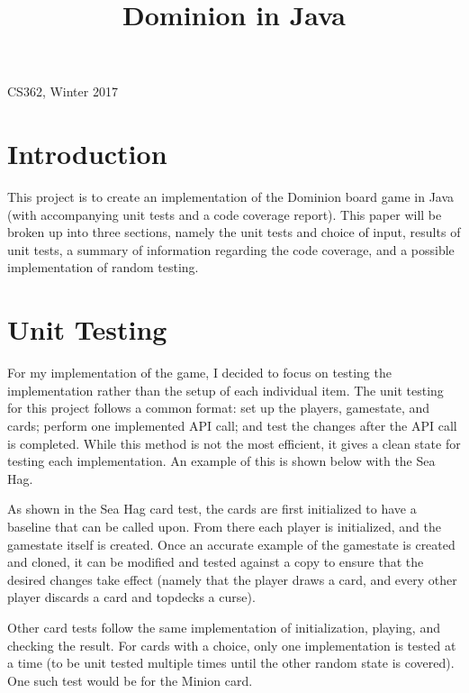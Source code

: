 \documentclass[letterpaper,10pt,onecolumn,draftclsnofoot]{IEEEtran}
\title{Dominion in Java}
\author{\name}
\def\class{CS362, Winter 2017}
\begin{document}
\clearpage
\maketitle
\thispagestyle{empty} %
\vspace{-10ex}
{\centering \class \par}

\section{Introduction}
This project is to create an implementation of the Dominion board game in Java (with accompanying unit tests and a code coverage report). This paper will be broken up into three sections, namely the unit tests and choice of input, results of unit tests, a summary of information regarding the code coverage, and a possible implementation of random testing.

\section{Unit Testing}
For my implementation of the game, I decided to focus on testing the implementation rather than the setup of each individual item. The unit testing for this project follows a common format: set up the players, gamestate, and cards; perform one implemented API call; and test the changes after the API call is completed. While this method is not the most efficient, it gives a clean state for testing each implementation. An example of this is shown below with the Sea Hag.



As shown in the Sea Hag card test, the cards are first initialized to have a baseline that can be called upon. From there each player is initialized, and the gamestate itself is created. Once an accurate example of the gamestate is created and cloned, it can be modified and tested against a copy to ensure that the desired changes take effect (namely that the player draws a card, and every other player discards a card and topdecks a curse).

Other card tests follow the same implementation of initialization, playing, and checking the result. For cards with a choice, only one implementation is tested at a time (to be unit tested multiple times until the other random state is covered). One such test would be for the Minion card.
\end{document}
